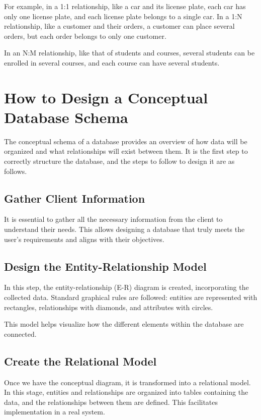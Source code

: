 \documentclass{article}
\begin{document}
For example, in a 1:1 relationship, like a car and its license plate, each car has only one license plate, and each license plate belongs to a single car. In a 1:N relationship, like a customer and their orders, a customer can place several orders, but each order belongs to only one customer.

In an N:M relationship, like that of students and courses, several students can be enrolled in several courses, and each course can have several students.

\section{How to Design a Conceptual Database Schema}

The conceptual schema of a database provides an overview of how data will be organized and what relationships will exist between them. It is the first step to correctly structure the database, and the steps to follow to design it are as follows.

\subsection{Gather Client Information}

It is essential to gather all the necessary information from the client to understand their needs. This allows designing a database that truly meets the user's requirements and aligns with their objectives.

\subsection{Design the Entity-Relationship Model}

In this step, the entity-relationship (E-R) diagram is created, incorporating the collected data. Standard graphical rules are followed: entities are represented with rectangles, relationships with diamonds, and attributes with circles.

This model helps visualize how the different elements within the database are connected.

\subsection{Create the Relational Model}

Once we have the conceptual diagram, it is transformed into a relational model. In this stage, entities and relationships are organized into tables containing the data, and the relationships between them are defined. This facilitates implementation in a real system.
\end{document}
